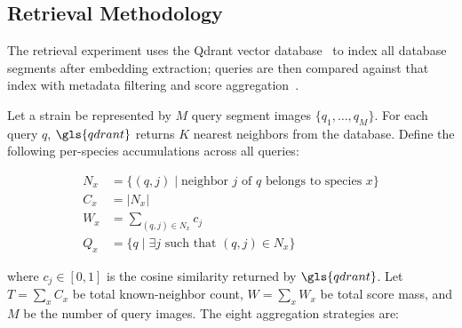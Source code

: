 \subsection{Retrieval Methodology}\label{retrieval-methodology}

The retrieval experiment uses the Qdrant vector database~\cite{qdrant} to index all database segments after embedding extraction; queries are then compared against that index with metadata filtering and score aggregation~\cite{cover1967knn}.

Let a strain be represented by $M$ query segment images $\{q_1,\dots,q_M\}$. For each query $q$, $\gls{qdrant}$ returns $K$ nearest neighbors from the database. Define the following per-species accumulations across all queries:

\begin{align}
N_x &= \{(q,j) \mid \text{neighbor }j\text{ of } q \text{ belongs to species } x\} \label{eq:neighbor_set}\\
C_x &= |N_x| \label{eq:count}\\
W_x &= \sum_{(q,j) \in N_x} c_j \label{eq:weight}\\
Q_x &= \{q \mid \exists j \text{ such that } (q,j) \in N_x\} \label{eq:query_set}
\end{align}

where $c_j \in [0,1]$ is the cosine similarity returned by $\gls{qdrant}$. Let $T = \sum_x C_x$ be total known-neighbor count, $W = \sum_x W_x$ be total score mass, and $M$ be the number of query images. The eight aggregation strategies are:

